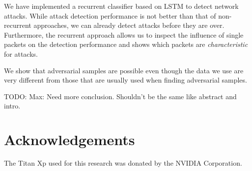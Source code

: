 \documentclass[conference]{IEEEtran}
\newcommand\note[2]{{\color{#1}#2}}
\newcommand\todo[1]{{\note{red}{TODO: #1}}}
\begin{document}
We have implemented a recurrent classifier based on LSTM to detect network attacks. While attack detection performance is not better than that of non-recurrent approaches, we can already detect attacks before they are over. Furthermore, the recurrent approach allows us to inspect the influence of single packets on the detection performance and shows which packets are \textit{characteristic} for attacks.

We show that adversarial samples are possible even though the data we use are very different from those that are usually used when finding adversarial samples.

\todo{Max: Need more conclusion. Shouldn't be the same like abstract and intro.}




\section*{Acknowledgements}
The Titan Xp used for this research was donated by the NVIDIA Corporation.
\end{document}
